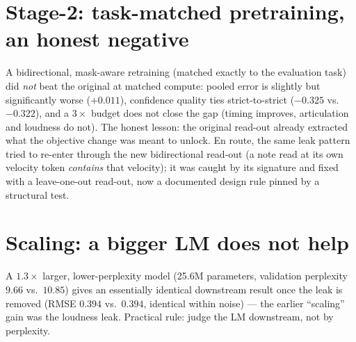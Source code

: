 \documentclass[11pt,a4paper]{report}
\begin{document}
\section{Stage-2: task-matched pretraining, an honest negative}
A bidirectional, mask-aware retraining (matched exactly to the evaluation task) did
\emph{not} beat the original at matched compute: pooled error is slightly but
significantly worse ($+0.011$), confidence quality ties strict-to-strict ($-0.325$
vs.\ $-0.322$), and a $3\times$ budget does not close the gap (timing improves,
articulation and loudness do not). The honest lesson: the original read-out already
extracted what the objective change was meant to unlock. En route, the same leak
pattern tried to re-enter through the new bidirectional read-out (a note read at its
own velocity token \emph{contains} that velocity); it was caught by its signature and
fixed with a leave-one-out read-out, now a documented design rule pinned by a
structural test.

\section{Scaling: a bigger LM does not help}
A $1.3\times$ larger, lower-perplexity model (25.6M parameters, validation
perplexity $9.66$ vs.\ $10.85$) gives an essentially identical downstream result once
the leak is removed (RMSE $0.394$ vs.\ $0.394$, identical within noise) --- the
earlier ``scaling'' gain was the loudness leak. Practical rule: judge the LM
downstream, not by perplexity.
\end{document}
